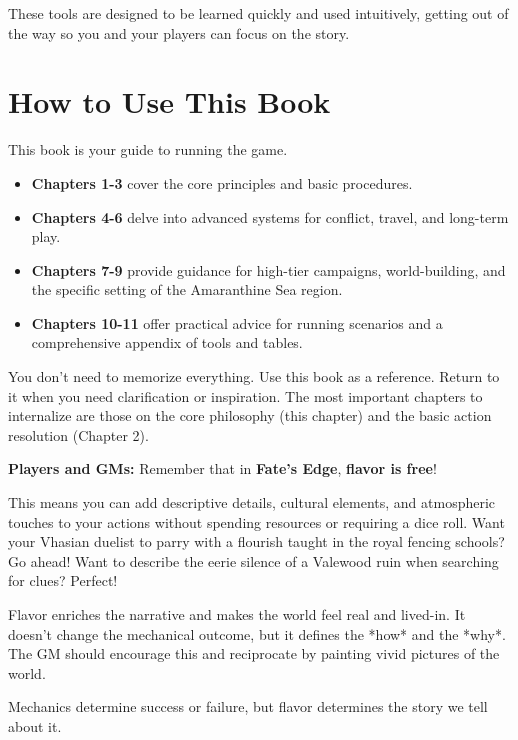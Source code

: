 These tools are designed to be learned quickly and used intuitively, getting out of the way so you and your players can focus on the story.

\section*{How to Use This Book}

This book is your guide to running the game.
\begin{itemize}
    \item \textbf{Chapters 1-3} cover the core principles and basic procedures.
    \item \textbf{Chapters 4-6} delve into advanced systems for conflict, travel, and long-term play.
    \item \textbf{Chapters 7-9} provide guidance for high-tier campaigns, world-building, and the specific setting of the Amaranthine Sea region.
    \item \textbf{Chapters 10-11} offer practical advice for running scenarios and a comprehensive appendix of tools and tables.
\end{itemize}

You don't need to memorize everything. Use this book as a reference. Return to it when you need clarification or inspiration. The most important chapters to internalize are those on the core philosophy (this chapter) and the basic action resolution (Chapter 2).

\begin{tcolorbox}[enhanced, sharp corners, boxrule=1pt, colback=gray!5!white, colframe=gray!75!black, title={Flavor is Free}]
\textbf{Players and GMs:} Remember that in \textbf{Fate's Edge}, \textbf{flavor is free}!

This means you can add descriptive details, cultural elements, and atmospheric touches to your actions without spending resources or requiring a dice roll. Want your Vhasian duelist to parry with a flourish taught in the royal fencing schools? Go ahead! Want to describe the eerie silence of a Valewood ruin when searching for clues? Perfect!

Flavor enriches the narrative and makes the world feel real and lived-in. It doesn't change the mechanical outcome, but it defines the *how* and the *why*. The GM should encourage this and reciprocate by painting vivid pictures of the world.

Mechanics determine success or failure, but flavor determines the story we tell about it.
\end{tcolorbox}

